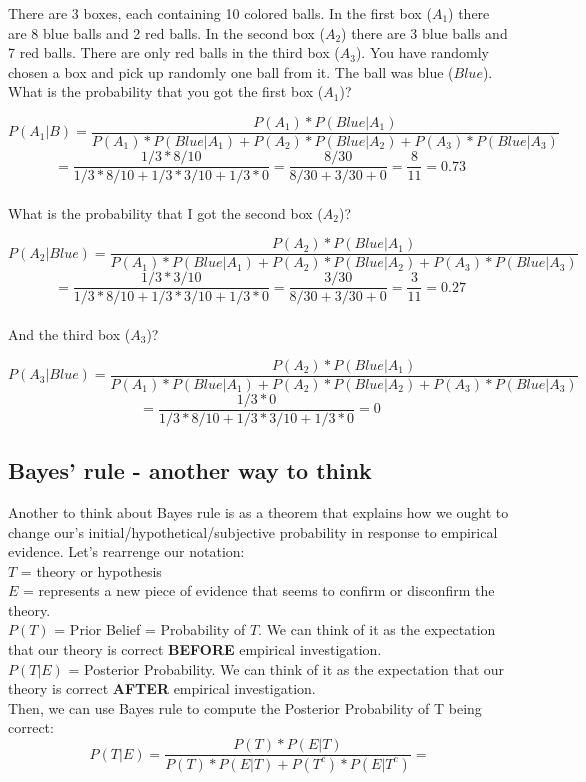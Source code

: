 \documentclass[11pt]{article}
\begin{document}
	There are 3 boxes, each containing 10 colored balls. In the first box ($A_1$) there are 8 blue balls and 2 red balls. In the second box ($A_2$) there are 3 blue balls and 7 red balls. There are only red balls in the third box ($A_3$). You have randomly chosen a box and pick up randomly one ball from it. The ball was blue ($Blue$). What is the probability that you got the first box ($A_1$)?
	
	\[P(A_1|B) = \frac{P(A_1)*P(Blue|A_1)}{P(A_1)*P(Blue|A_1)+P(A_2)*P(Blue|A_2)+P(A_3)*P(Blue|A_3)}\]
	\[= \frac{1/3*8/10}{1/3*8/10+1/3*3/10+1/3*0} = \frac{8/30}{8/30+3/30+0} = \frac{8}{11} = 0.73\]\\

	What is the probability that I got the second box ($A_2$)?
	
	\[P(A_2|Blue) = \frac{P(A_2)*P(Blue|A_1)}{P(A_1)*P(Blue|A_1)+P(A_2)*P(Blue|A_2)+P(A_3)*P(Blue|A_3)}\]
	\[= \frac{1/3*3/10}{1/3*8/10+1/3*3/10+1/3*0} = \frac{3/30}{8/30+3/30+0} = \frac{3}{11} = 0.27\]\\

	And the third box ($A_3$)?

	\[P(A_3|Blue) = \frac{P(A_2)*P(Blue|A_1)}{P(A_1)*P(Blue|A_1)+P(A_2)*P(Blue|A_2)+P(A_3)*P(Blue|A_3)}\]
	\[= \frac{1/3*0}{1/3*8/10+1/3*3/10+1/3*0} = 0\] 


	\subsection*{Bayes' rule - another way to think}
	Another to think about Bayes rule is as	a theorem that explains how we ought to change our’s initial/hypothetical/subjective probability in response to empirical evidence. Let's rearrenge our notation:\\
	
	$T$ = theory or hypothesis \\

	$E$ = represents a new piece of evidence that seems to confirm or disconfirm the theory.\\
	
	$P(T)$ =  Prior Belief = Probability of $T$. We can think of it as the expectation that our theory is correct \textbf{BEFORE} empirical investigation.\\
	
	$P(T|E)$ = Posterior Probability. We can think of it as the expectation that our theory is correct \textbf{AFTER} empirical investigation.\\
	
	Then, we can use Bayes rule to compute the Posterior Probability of T being correct:\\
	
	\[P(T|E) = \frac{P(T)*P(E|T)}{P(T)*P(E|T)+P(T^c)*P(E|T^c)}=\]
\end{document}
